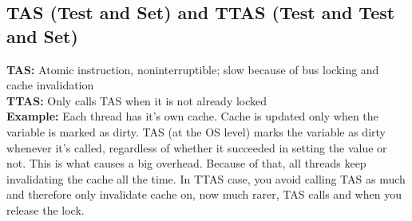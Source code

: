 	\subsection{TAS (Test and Set) and TTAS (Test and Test and Set)}
		\textbf{TAS:} Atomic instruction, noninterruptible; slow because of bus locking and cache invalidation \\
		\textbf{TTAS:} Only calls TAS when it is not already locked\\
		\textbf{Example:} Each thread has it's own cache. Cache is updated only when the variable is marked as dirty. TAS (at the OS level) marks the variable as dirty whenever it's called, regardless of whether it succeeded in setting the value or not. This is what causes a big overhead. Because of that, all threads keep invalidating the cache all the time. In TTAS case, you avoid calling TAS as much and therefore only invalidate cache on, now much rarer, TAS calls and when you release the lock.
		

